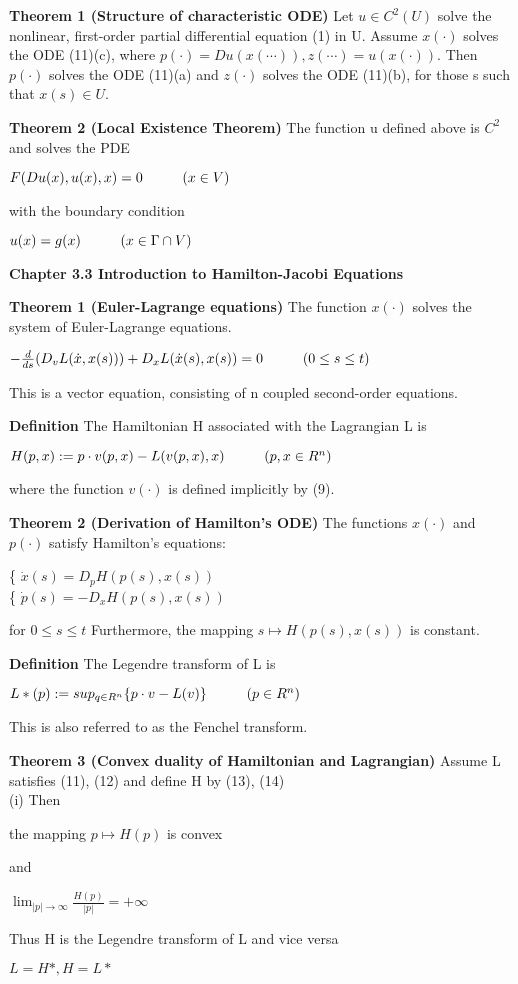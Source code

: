 \documentclass{article}
\newcommand\tab[1][1cm]{\hspace*{#1}}
\begin{document}
\textbf {Theorem 1 (Structure of characteristic ODE)} Let $u \in C^2(U)$ solve the nonlinear, first-order partial differential equation (1) in U. Assume $x(\cdot)$ solves the ODE (11)(c), where $p(\cdot) = Du(x(\cdots)), z(\cdots) = u(x(\cdot)).$ Then $p(\cdot)$ solves the ODE (11)(a) and $z(\cdot)$ solves the ODE (11)(b), for those s such that $x(s) \in U$.

\textbf {Theorem 2 (Local Existence Theorem)} The function u defined above is $C^2$ and solves the PDE
\begin{center}
$F(Du(x), u(x), x) = 0 \tab (x \in V)$
\end{center}
with the boundary condition
\begin{center}
$u(x) = g(x) \tab (x \in \Gamma \cap V)$
\end{center}

\textbf {Chapter 3.3 Introduction to Hamilton-Jacobi Equations}

\textbf {Theorem 1 (Euler-Lagrange equations)} The function $x(\cdot)$ solves the system of Euler-Lagrange equations.
\begin{center}
$- \frac{d}{ds} (D_v L(\dot{x}, x(s))) + D_x L(\dot{x}(s), x(s)) = 0 \tab (0 \leq s \leq t)$
\end{center}
This is a vector equation, consisting of n coupled second-order equations.

\textbf {Definition} The Hamiltonian H associated with the Lagrangian L is 
\begin{center}
$H(p,x) := p \cdot v(p,x) - L(v(p,x),x) \tab (p, x \in R^n)$
\end{center}
where the function $v(\cdot)$ is defined implicitly by (9).

\textbf {Theorem 2 (Derivation of Hamilton's ODE)} The functions $x(\cdot)$ and $p(\cdot)$ satisfy Hamilton's equations:
\begin{center}
\{ $\dot{x}(s) = D_p H(p(s), x(s))$ \\
\{ $\dot{p}(s) = -D_x H(p(s), x(s))$  
\end{center}
for $0 \leq s \leq t$ Furthermore, the mapping $s \mapsto H(p(s), x(s))$ is constant.

\textbf {Definition} The Legendre transform of L is 
\begin{center}
$L*(p) := sup_{q \in R^n} \{p \cdot v - L(v)\} \tab (p \in R^n)$
\end{center}
This is also referred to as the Fenchel transform.

\textbf {Theorem 3 (Convex duality of Hamiltonian and Lagrangian)} Assume L satisfies (11), (12) and define H by (13), (14) \\
\tab (i) Then
\begin{center}
the mapping $p \mapsto H(p)$ is convex
\end{center}
and 
\begin{center}
$\lim_{|p| \to \infty} \frac{H(p)}{|p|} = + \infty$
\end{center}
\tab Thus H is the Legendre transform of L and vice versa
\begin{center}
$L = H*, H = L*$
\end{center}
\end{document}
